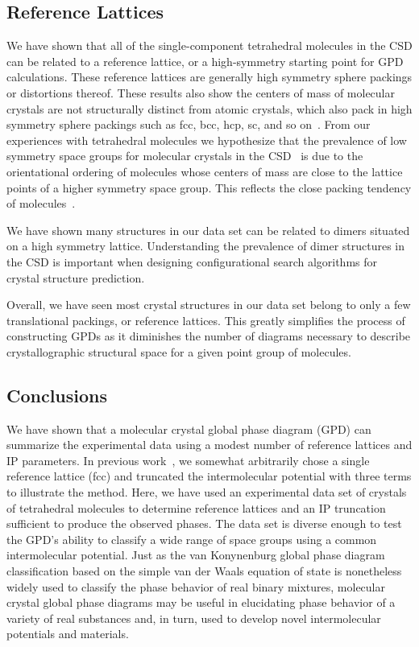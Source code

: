 \documentclass[preprint]{revtex4}              %
\begin{document}
\subsection{Reference Lattices}

We have shown that all of the single-component tetrahedral molecules
in the CSD can be related to a reference lattice, or a high-symmetry
starting point for GPD calculations.  These reference lattices are
generally high symmetry sphere packings or distortions thereof.
These results also show the centers of mass of molecular crystals
are not structurally distinct from atomic crystals, which also pack
in high symmetry sphere packings such as fcc, bcc, hcp, sc, and so
on~\cite{Mighell80}. From our experiences with tetrahedral molecules
we hypothesize that the prevalence of low symmetry space groups for
molecular crystals in the CSD~\cite{Allen02} is due to the
orientational ordering of molecules whose centers of mass are close
to the lattice points of a higher symmetry space group. This
reflects the close packing tendency of
molecules~\cite{Kitaigorodskii61}.

We have shown many structures in our data set can be related to
dimers situated on a high symmetry lattice. Understanding the
prevalence of dimer structures in the CSD is important when
designing configurational search algorithms for crystal structure
prediction.

Overall, we have seen most crystal structures in our data set belong
to only a few translational packings, or reference lattices.  This
greatly simplifies the process of constructing GPDs as it diminishes
the number of diagrams necessary to describe crystallographic
structural space for a given point group of molecules.



\subsection{Conclusions}

We have shown that a molecular crystal global phase diagram (GPD)
can summarize the experimental data using a modest number of
reference lattices and IP parameters. In previous
work~\cite{Keith04c,Mettes04}, we somewhat arbitrarily chose a
single reference lattice (fcc) and truncated the intermolecular
potential with three terms to illustrate the method. Here, we have
used an experimental data set of crystals of tetrahedral molecules
to determine reference lattices and an IP truncation sufficient to
produce the observed phases. The data set is diverse enough to test
the GPD's ability to classify a wide range of space groups using a
common intermolecular potential. Just as the van Konynenburg global
phase diagram classification based on the simple van der Waals
equation of state is nonetheless widely used to classify the phase
behavior of real binary mixtures, molecular crystal global phase
diagrams may be useful in elucidating phase behavior of a variety of
real substances and, in turn, used to develop novel intermolecular
potentials and materials.
\end{document}
